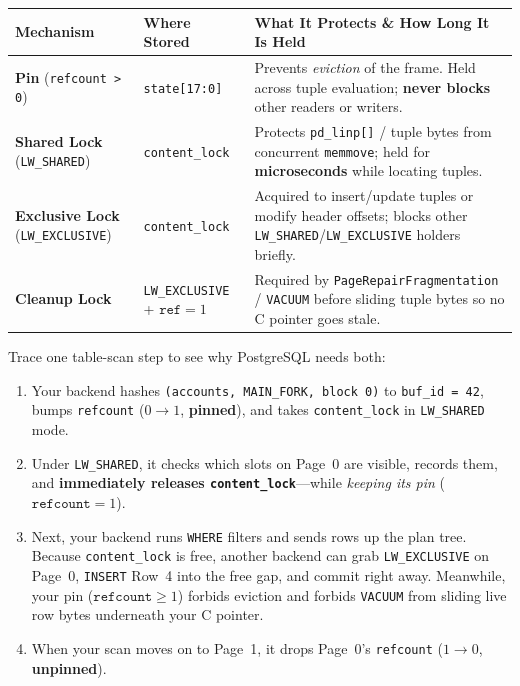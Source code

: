 \begin{center}
\small
\begin{tabular}{@{}llp{6.8cm}@{}}
\toprule
\textbf{Mechanism} & \textbf{Where Stored} & \textbf{What It Protects \& How Long It Is Held} \\
\midrule
\textbf{Pin} (\texttt{refcount > 0}) & \texttt{state[17:0]} & Prevents \emph{eviction} of the frame. Held across tuple evaluation; \textbf{never blocks} other readers or writers. \\
\textbf{Shared Lock} (\texttt{LW\_SHARED}) & \texttt{content\_lock} & Protects \texttt{pd\_linp[]} / tuple bytes from concurrent \texttt{memmove}; held for \textbf{microseconds} while locating tuples. \\
\textbf{Exclusive Lock} (\texttt{LW\_EXCLUSIVE}) & \texttt{content\_lock} & Acquired to insert/update tuples or modify header offsets; blocks other \texttt{LW\_SHARED}/\texttt{LW\_EXCLUSIVE} holders briefly. \\
\textbf{Cleanup Lock} & \texttt{LW\_EXCLUSIVE} + $\texttt{ref}=1$ & Required by \texttt{PageRepairFragmentation} / \texttt{VACUUM} before sliding tuple bytes so no C pointer goes stale. \\
\bottomrule
\end{tabular}
\end{center}

Trace one table-scan step to see why PostgreSQL needs both:
\begin{enumerate}
  \item Your backend hashes \texttt{(accounts, MAIN\_FORK, block 0)} to \texttt{buf\_id = 42}, bumps \texttt{refcount} ($0 \to 1$, \textbf{pinned}), and takes \texttt{content\_lock} in \texttt{LW\_SHARED} mode.
  \item Under \texttt{LW\_SHARED}, it checks which slots on Page~0 are visible, records them, and \textbf{immediately releases \texttt{content\_lock}}---while \emph{keeping its pin} ($\texttt{refcount} = 1$).
  \item Next, your backend runs \texttt{WHERE} filters and sends rows up the plan tree. Because \texttt{content\_lock} is free, another backend can grab \texttt{LW\_EXCLUSIVE} on Page~0, \texttt{INSERT} Row~4 into the free gap, and commit right away. Meanwhile, your pin ($\texttt{refcount} \ge 1$) forbids eviction and forbids \texttt{VACUUM} from sliding live row bytes underneath your C pointer.
  \item When your scan moves on to Page~1, it drops Page~0's \texttt{refcount} ($1 \to 0$, \textbf{unpinned}).
\end{enumerate}

